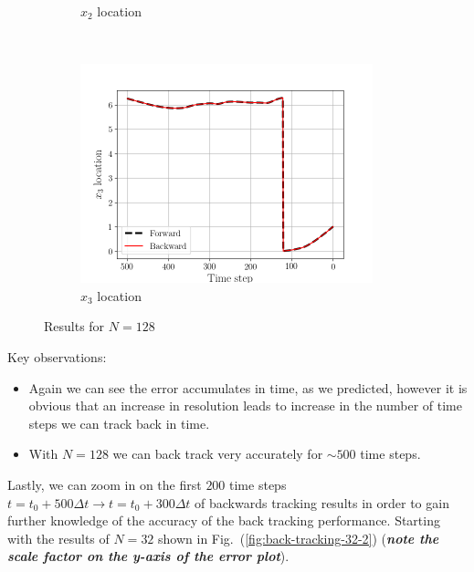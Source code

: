 \begin{figure}[H]
\begin{subfigure}[H]{0.45\textwidth}
        \caption{$x_{2}$ location}
    \end{subfigure}
    ~
    \begin{subfigure}[H]{0.45\textwidth}
        \includegraphics[height=2.5in]{media/rk4/run-128/x3-128-tracking.png}
        \caption{$x_{3}$ location}
    \end{subfigure}
    \caption{Results for $N=128$}
    \label{fig:back-tracking-128}
\end{figure}
Key observations:
\begin{itemize}
    \item Again we can see the error accumulates in time, as we predicted,
            however it is obvious that an increase in resolution leads to
            increase in the number of time steps we can track back in time. 
    \item With $N=128$ we can back track very accurately for $\sim 500$
        time steps.
\end{itemize}
\newpage
Lastly, we can zoom in on the first $200$ time steps $t=t_{0}+500\Delta t
\rightarrow t = t_{0} + 300\Delta t$ of backwards tracking results in order
to gain further knowledge of the accuracy of the back tracking performance.
Starting with the results of $N=32$ shown in
Fig.~(\ref{fig:back-tracking-32-2}) (\emph{\textbf{note the scale factor on the
y-axis of the error plot}}).
